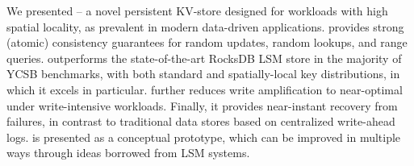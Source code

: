 We presented \sys\/ -- a novel persistent KV-store designed for workloads with high spatial locality, as prevalent in modern data-driven 
applications. \sys\/ provides strong (atomic) consistency guarantees for random updates, random lookups, and range queries. 
\sys\/ outperforms the state-of-the-art RocksDB LSM store  in the  majority of YCSB benchmarks, with both 
standard and spatially-local key distributions, in which it excels in particular. \sys\/ further reduces write amplification to near-optimal under write-intensive 
workloads. Finally, it provides near-instant recovery from failures, in contrast to traditional data stores based on centralized write-ahead logs.
\sys\/ is presented as a conceptual prototype, which can be improved in multiple ways through ideas borrowed from LSM systems. 
